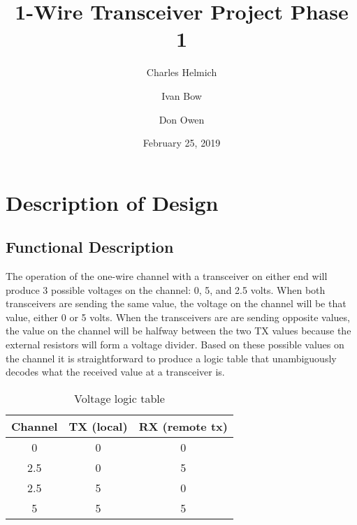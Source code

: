 \documentclass[12pt, letterpaper]{article}
\title{1-Wire Transceiver Project Phase 1}
\author{Charles Helmich \and Ivan Bow \and Don Owen}
\date{February 25, 2019}
\begin{document}
\maketitle

\tableofcontents

\section{Description of Design}
\subsection{Functional Description}
The operation of the one-wire channel with a transceiver on either end will produce 3 possible voltages on the channel: 0, 5, and 2.5 volts.
When both transceivers are sending the same value, the voltage on the channel will be that value, either 0 or 5 volts.
When the transceivers are are sending opposite values, the value on the channel will be halfway between the two TX values because the external resistors will form a voltage divider.
Based on these possible values on the channel it is straightforward to produce a logic table that unambiguously decodes what the received value at a transceiver is.

\begin{table}[htb]
    \centering
    \begin{tabular}{c c c}
        Channel & TX (local) & RX (remote tx) \\
        \hline
        0   & 0 & 0 \\
        2.5 & 0 & 5 \\
        2.5 & 5 & 0 \\
        5   & 5 & 5 \\
        \hline
    \end{tabular}
    \caption{Voltage logic table}
\end{table}
\end{document}
